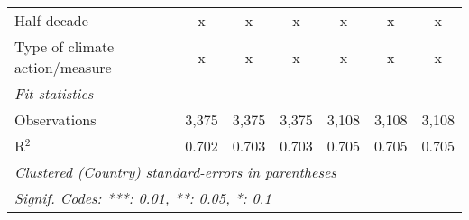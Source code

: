 \begin{tabular}{lcccccc}
   Half decade                                          & x       & x             & x             & x             & x             & x\\  
   Type of climate action/measure                       & x       & x             & x             & x             & x             & x\\  
   \midrule \emph{Fit statistics}\\
   Observations                                         & 3,375   & 3,375         & 3,375         & 3,108         & 3,108         & 3,108\\  
   R$^2$                                                & 0.702   & 0.703         & 0.703         & 0.705         & 0.705         & 0.705\\  
   \midrule
   \multicolumn{7}{l}{\emph{Clustered (Country) standard-errors in parentheses}}\\
   \multicolumn{7}{l}{\emph{Signif. Codes: ***: 0.01, **: 0.05, *: 0.1}}\\
\end{tabular}
\par\endgroup


